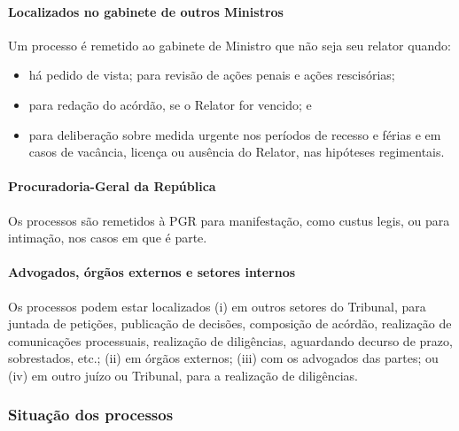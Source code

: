 \documentclass[
]{book}
\providecommand{\tightlist}{%
  \setlength{\itemsep}{0pt}\setlength{\parskip}{0pt}}
\theoremstyle{definition}
\theoremstyle{definition}
\theoremstyle{definition}
\theoremstyle{definition}
\theoremstyle{remark}
\begin{document}
\hypertarget{localizados-no-gabinete-de-outros-ministros}{%
\paragraph{Localizados no gabinete de outros Ministros}\label{localizados-no-gabinete-de-outros-ministros}}

Um processo é remetido ao gabinete de Ministro que não seja seu relator quando:

\begin{itemize}
\tightlist
\item
  há pedido de vista; para revisão de ações penais e ações rescisórias;
\item
  para redação do acórdão, se o Relator for vencido; e
\item
  para deliberação sobre medida urgente nos períodos de recesso e férias e em casos de vacância, licença ou ausência do Relator, nas hipóteses regimentais.
\end{itemize}

\hypertarget{procuradoria-geral-da-repuxfablica}{%
\paragraph{Procuradoria-Geral da República}\label{procuradoria-geral-da-repuxfablica}}

Os processos são remetidos à PGR para manifestação, como custus legis, ou para intimação, nos casos em que é parte.

\hypertarget{advogados-uxf3rguxe3os-externos-e-setores-internos}{%
\paragraph{Advogados, órgãos externos e setores internos}\label{advogados-uxf3rguxe3os-externos-e-setores-internos}}

Os processos podem estar localizados (i) em outros setores do Tribunal, para juntada de petições, publicação de decisões, composição de acórdão, realização de comunicações processuais, realização de diligências, aguardando decurso de prazo, sobrestados, etc.; (ii) em órgãos externos; (iii) com os advogados das partes; ou (iv) em outro juízo ou Tribunal, para a realização de diligências.

\hypertarget{situauxe7uxe3o-dos-processos}{%
\subsubsection{Situação dos processos}\label{situauxe7uxe3o-dos-processos}}
\end{document}

